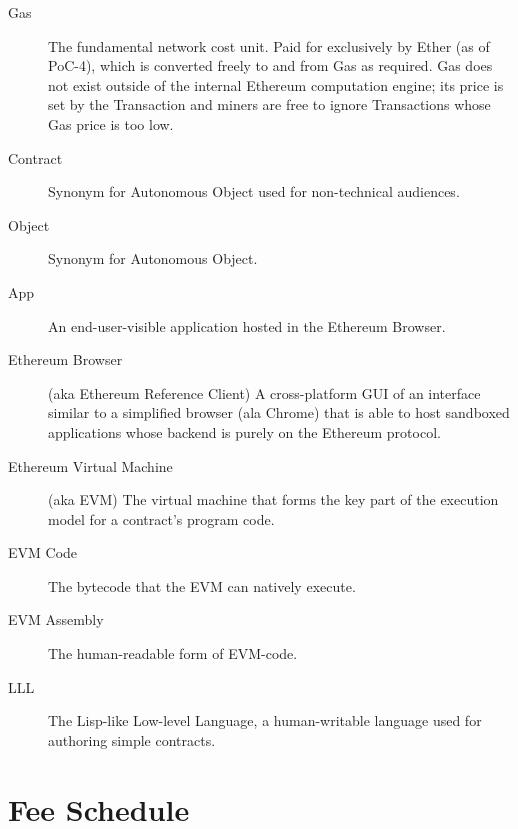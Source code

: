 \documentclass[9pt,oneside]{amsart}
\begin{document}
\begin{description}
\item[Gas] The fundamental network cost unit. Paid for exclusively by Ether (as of PoC-4), which is converted freely to and from Gas as required. Gas does not exist outside of the internal Ethereum computation engine; its price is set by the Transaction and miners are free to ignore Transactions whose Gas price is too low.

\item[Contract] Synonym for Autonomous Object used for non-technical audiences.

\item[Object] Synonym for Autonomous Object.

\item[App] An end-user-visible application hosted in the Ethereum Browser.

\item[Ethereum Browser] (aka Ethereum Reference Client) A cross-platform GUI of an interface similar to a simplified browser (ala Chrome) that is able to host sandboxed applications whose backend is purely on the Ethereum protocol.

\item[Ethereum Virtual Machine] (aka EVM) The virtual machine that forms the key part of the execution model for a contract's program code.

\item[EVM Code] The bytecode that the EVM can natively execute.

\item[EVM Assembly] The human-readable form of EVM-code.

\item[LLL] The Lisp-like Low-level Language, a human-writable language used for authoring simple contracts.

\end{description}

\section{Fee Schedule}\label{app:fees}
\end{document}

